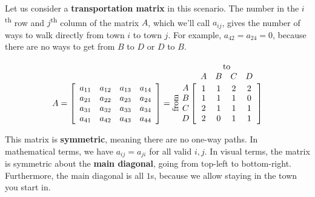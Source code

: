 \documentclass[../textbook.tex]{subfiles}
\begin{document}
Let us consider a \textbf{transportation matrix} in this scenario. The number in the $i$\textsuperscript{th} row and $j$\textsuperscript{th} column of the matrix $A$, which we'll call $a_{ij}$, gives the number of ways to walk directly from town $i$ to town $j$. For example, $a_{42} = a_{24} = 0$, because there are no ways to get from $B$ to $D$ or $D$ to $B$.

$$
  A = \left[\begin{array}{cccc}
  a_{11} & a_{12} & a_{13} & a_{14} \\
a_{21} & a_{22} & a_{23} & a_{24} \\
a_{31} & a_{32} & a_{33} & a_{34} \\
a_{41} & a_{42} & a_{43} & a_{44} \\
  \end{array}\right] =
  \rotatebox[origin=c]{90}{from}\;\,
  \begin{array}{@{}c@{}}
    \rowind{A} \\ \rowind{B} \\ \rowind{C} \\ \rowind{D}
  \end{array}
  \mathop{\left[
  \begin{array}{cccc}
     \colind{1}{A}  &  \colind{1}{B}  &  \colind{2}{C}  & \colind{2}{D} \\
1 & 1 & 1 & 0 \\
2 & 1 & 1 & 1 \\
2 & 0 & 1 & 1 \\
  \end{array}
  \right]}^{
  \begin{array}{@{}c@{}}
    \rowind{\text{to}} \\ \mathstrut
  \end{array}
  }
$$

\noindent This matrix is \textbf{symmetric}, meaning there are no one-way paths. In mathematical terms, we have $a_{ij}=a_{ji}$ for all valid $i,j$. In visual terms, the matrix is symmetric about the \textbf{main diagonal}, going from top-left to bottom-right. Furthermore, the main diagonal is all $1$s, because we allow staying in the town you start in.
\end{document}
